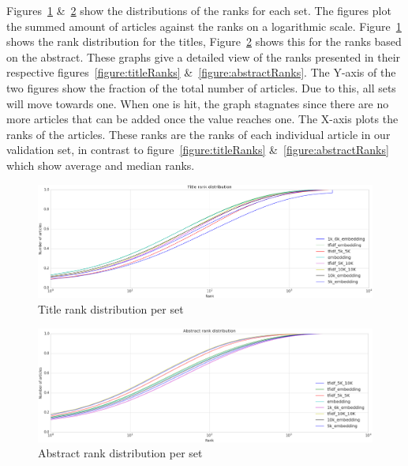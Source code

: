 \documentclass[../../Thesis.tex]{subfiles}
\begin{document}
Figures~\ref{figure:titleDistribution} \&~\ref{figure:abstractDistribution} show the distributions of the ranks for each set. The figures plot the summed amount of articles against the ranks on a logarithmic scale. Figure~\ref{figure:titleDistribution} shows the rank distribution for the titles, Figure~\ref{figure:abstractDistribution} shows this for the ranks based on the abstract. These graphs give a detailed view of the ranks presented in their respective figures~\ref{figure:titleRanks} \&~\ref{figure:abstractRanks}. The Y-axis of the two figures show the fraction of the total number of articles. Due to this, all sets will move towards one. When one is hit, the graph stagnates since there are no more articles that can be added once the value reaches one. The X-axis plots the ranks of the articles. These ranks are the ranks of each individual article in our validation set, in contrast to figure~\ref{figure:titleRanks} \&~\ref{figure:abstractRanks} which show average and median ranks.
\begin{figure}[hbt]
\includegraphics[width=6.5in]{Plots/Title_rank_distribution}
\caption{Title rank distribution per set}\label{figure:titleDistribution}
\end{figure}
\begin{figure}[hbt]
\includegraphics[width=6.5in]{Plots/Abstract_rank_distribution}
\caption{Abstract rank distribution per set}\label{figure:abstractDistribution}
\end{figure}
\end{document}
